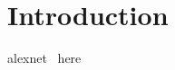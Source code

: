 \chapter{Introduction}\label{sec-introduction}

alexnet~\cite{krizhevsky2012imagenet} here

\newpage
